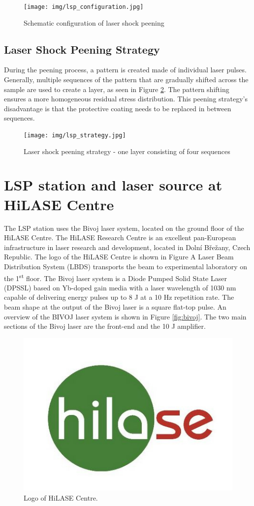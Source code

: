 \begin{figure}[h]
    \centering
    \texttt{[image: img/lsp\_configuration.jpg]}
    \caption{Schematic configuration of laser shock peening}
    \label{fig:lspconfiguration}
\end{figure}

\subsection{Laser Shock Peening Strategy}
During the peening process, a pattern is created made of individual laser pulses. Generally, multiple sequences of the pattern that are gradually shifted across the sample are used to create a layer, as seen in Figure \ref{fig:lspstrategy}. The pattern shifting ensures a more homogeneous residual stress distribution. This peening strategy's disadvantage is that the protective coating needs to be replaced in between sequences.

\begin{figure}[h]
    \centering
    \texttt{[image: img/lsp\_strategy.jpg]}
    \caption{Laser shock peening strategy - one layer consisting of four sequences}
    \label{fig:lspstrategy}
\end{figure}

\section{LSP station and laser source at HiLASE Centre}

The LSP station uses the Bivoj laser system, located on the ground floor of the HiLASE Centre. The HiLASE Research Centre is an excellent pan-European infrastructure in laser research and development, located in Dolní Břežany, Czech Republic. The logo of the HiLASE Centre is shown in Figure A Laser Beam Distribution System (LBDS) transports the beam to
experimental laboratory on the 1\textsuperscript{st} floor. The Bivoj laser system is a Diode Pumped Solid State Laser (DPSSL) based on Yb-doped gain media with a laser wavelength of 1030 nm capable of delivering energy pulses up to 8 J at a 10 Hz repetition rate. The beam shape at the output of the Bivoj laser is a square flat-top pulse. An overview of the BIVOJ laser system is shown in Figure \ref{fig:bivoj}. The two main sections of the Bivoj laser are the front-end and the 10 J amplifier.



\begin{figure}[h]
    \centering
    \includegraphics[width=0.6\linewidth]{img/hilase.jpg}
    \caption{Logo of HiLASE Centre.}
    \label{fig:lspconfiguration}
\end{figure}

